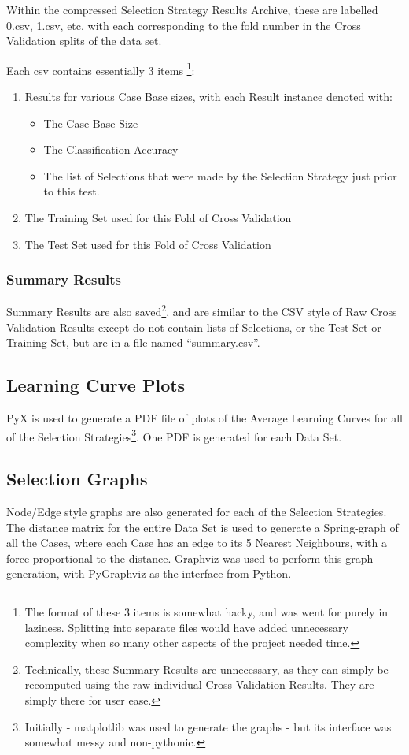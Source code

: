 \documentclass[a4paper,11pt]{report}
\begin{document}
Within the compressed Selection Strategy Results Archive, these are labelled 0.csv, 1.csv, etc. with each corresponding to the fold number in the Cross Validation splits of the data set.

Each csv contains essentially 3 items \footnote{The format of these 3 items is somewhat hacky, and was went for purely in laziness. Splitting into separate files would have added unnecessary complexity when so many other aspects of the project needed time.}:

\begin{enumerate}
	\item Results for various Case Base sizes, with each Result instance denoted with:
		\begin{itemize}
			\item The Case Base Size
			\item The Classification Accuracy
			\item The list of Selections that were made by the Selection Strategy just prior to this test.
		\end{itemize}
	\item The Training Set used for this Fold of Cross Validation
	\item The Test Set used for this Fold of Cross Validation
\end{enumerate}

\subsubsection{Summary Results}
Summary Results are also saved\footnote{Technically, these Summary Results are unnecessary, as they can simply be recomputed using the raw individual Cross Validation Results. They are simply there for user ease.}, and are similar to the CSV style of Raw Cross Validation Results except do not contain lists of Selections, or the Test Set or Training Set, but are in a file named ``summary.csv''.

\subsection{Learning Curve Plots}
PyX\citep{prog:pyx} is used to generate a PDF file of plots of the Average Learning Curves for all of the Selection Strategies\footnote{Initially - matplotlib\citep{prog:matplotlib} was used to generate the graphs - but its interface was somewhat messy and non-pythonic.}. One PDF is generated for each Data Set.

\subsection{Selection Graphs}
Node/Edge style graphs are also generated for each of the Selection Strategies. The distance matrix for the entire Data Set is used to generate a Spring-graph of all the Cases, where each Case has an edge to its 5 Nearest Neighbours, with a force proportional to the distance. Graphviz\citep{prog:graphviz} was used to perform this graph generation, with PyGraphviz\citep{prog:pygraphviz} as the interface from Python.
\end{document}
